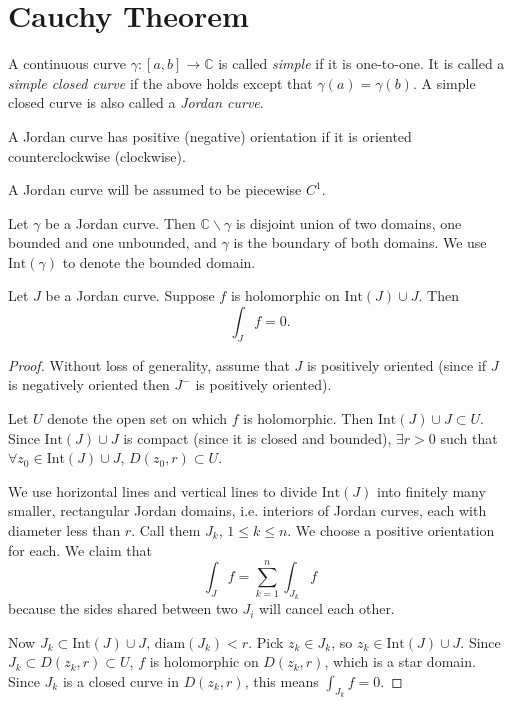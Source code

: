 \section{Cauchy Theorem}

\begin{defn}
A continuous curve $\gamma: [a, b] \to \mathbb{C}$ is called
\emph{simple} if it is one-to-one. It is called a
\emph{simple closed curve} if the above holds except that
$\gamma(a) = \gamma(b)$. A simple closed curve is also called
a \emph{Jordan curve}.

A Jordan curve has positive (negative) orientation if it is
oriented counterclockwise (clockwise).

A Jordan curve will be assumed to be piecewise $C^1$.
\end{defn}

\begin{theorem}
Let $\gamma$ be a Jordan curve. Then $\mathbb{C} \backslash \gamma$
is disjoint union of two domains, one bounded and one unbounded,
and $\gamma$ is the boundary of both domains. We use
$\mathrm{Int}(\gamma)$ to denote the bounded domain.
\end{theorem}

\begin{theorem}
Let $J$ be a Jordan curve. Suppose $f$ is holomorphic on
$\mathrm{Int}(J) \cup J$. Then
$$
\int_J f = 0.
$$
\end{theorem}

\begin{proof}
Without loss of generality, assume that $J$ is positively oriented
(since if $J$ is negatively oriented then $J^{-}$ is positively oriented).

Let $U$ denote the open set on which $f$ is holomorphic. Then
$\mathrm{Int}(J) \cup J \subset U$. Since $\mathrm{Int}(J) \cup J$ is
compact (since it is closed and bounded), $\exists r > 0$ such that
$\forall z_0 \in \mathrm{Int}(J) \cup J$, $D(z_0, r) \subset U$.

We use horizontal lines and vertical lines to divide $\mathrm{Int}(J)$
into finitely many smaller, rectangular
Jordan domains, i.e. interiors of Jordan curves,
each with diameter less than $r$. Call them $J_k$, $1 \leq k \leq n$.
We choose a positive orientation for each. We claim that
$$
\int_J f = \sum_{k=1}^n \int_{J_k} f
$$
because the sides shared between two $J_i$ will cancel each other.

Now $J_k \subset \mathrm{Int}(J) \cup J$, $\mathrm{diam}(J_k) < r$.
Pick $z_k \in J_k$, so $z_k \in \mathrm{Int}(J) \cup J$. Since
$J_k \subset D(z_k, r) \subset U$, $f$ is holomorphic on
$D(z_k, r)$, which is a star domain. Since $J_k$ is a closed
curve in $D(z_k, r)$, this means $\int_{J_k} f = 0$.
\end{proof}

